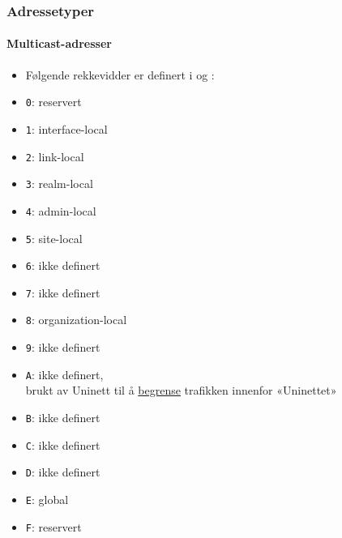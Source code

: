 \begin{frame}[fragile]
  \frametitle{Adressetyper}
  \framesubtitle{Multicast-adresser}
  \begin{multicols}{2}
    \begin{itemize}
    \item Følgende rekkevidder er definert i  og :
    \item \texttt{0}: reservert
    \item \texttt{1}: interface-local
    \item \texttt{2}: link-local
    \item \texttt{3}: realm-local
    \item \texttt{4}: admin-local
    \item \texttt{5}: site-local
    \item \texttt{6}: ikke definert
    \item \texttt{7}: ikke definert
    \item \texttt{8}: organization-local
    \item \texttt{9}: ikke definert
    \item \texttt{A}: ikke definert,\\ brukt av Uninett til å
      \href{http://drift.uninett.no/nett/ip-nett/ipv6-multicastadresser.html}{begrense}
      trafikken innenfor «Uninettet»
    \item \texttt{B}: ikke definert
    \item \texttt{C}: ikke definert
    \item \texttt{D}: ikke definert
    \item \texttt{E}: global
    \item \texttt{F}: reservert
    \end{itemize}
  \end{multicols}
\end{frame}

